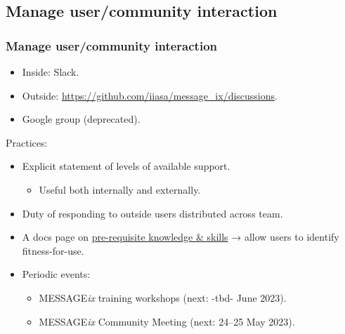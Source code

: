 \documentclass[12pt,aspectratio=169]{beamer}
\begin{document}
\subsection{Manage user/community interaction}
\begin{frame}
\frametitle{Manage user/community interaction}

\begin{itemize}
  \item Inside: Slack.
  \item Outside: \url{https://github.com/iiasa/message_ix/discussions}.
  \item Google group (deprecated).
\end{itemize}

\medskip
Practices:
\begin{itemize}
  \item Explicit statement of levels of available support.
    \begin{itemize}
      \item Useful both internally and externally.
    \end{itemize}
  \item Duty of responding to outside users distributed across team.
  \item A docs page on \href{https://docs.messageix.org/en/stable/prereqs.html}{pre-requisite knowledge \& skills} → allow users to identify fitness-for-use.
  \item Periodic events:
    \begin{itemize}
      \item MESSAGE\emph{ix} training workshops (next: -tbd- June 2023).
      \item MESSAGE\emph{ix} Community Meeting (next: 24–25 May 2023).
    \end{itemize}
\end{itemize}

\end{frame}
\end{document}
